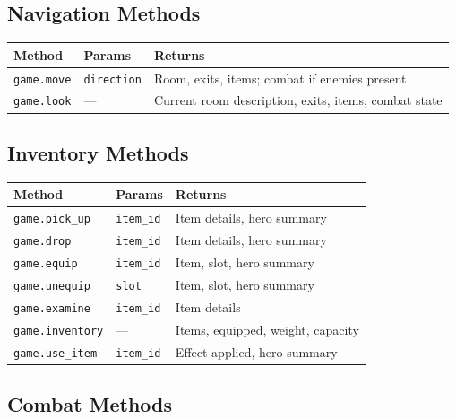 \documentclass[a4paper,10pt]{article}
\newcommand{\field}[1]{\texttt{#1}}
\begin{document}
\subsection{Navigation Methods}

\begin{center}
\begin{tabular}{lp{4cm}p{5cm}}
\toprule
\textbf{Method} & \textbf{Params} & \textbf{Returns} \\
\midrule
\texttt{game.move}
  & \field{direction}
  & Room, exits, items; combat if enemies present \\
\texttt{game.look}
  & ---
  & Current room description, exits, items, combat state \\
\bottomrule
\end{tabular}
\end{center}

\subsection{Inventory Methods}

\begin{center}
\begin{tabular}{lp{4cm}p{5cm}}
\toprule
\textbf{Method} & \textbf{Params} & \textbf{Returns} \\
\midrule
\texttt{game.pick\_up}  & \field{item\_id} & Item details, hero summary \\
\texttt{game.drop}      & \field{item\_id} & Item details, hero summary \\
\texttt{game.equip}     & \field{item\_id} & Item, slot, hero summary \\
\texttt{game.unequip}   & \field{slot}     & Item, slot, hero summary \\
\texttt{game.examine}   & \field{item\_id} & Item details \\
\texttt{game.inventory} & ---              & Items, equipped, weight, capacity \\
\texttt{game.use\_item} & \field{item\_id} & Effect applied, hero summary \\
\bottomrule
\end{tabular}
\end{center}

\subsection{Combat Methods}
\end{document}
